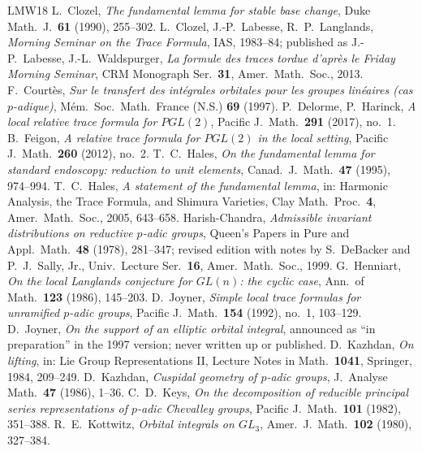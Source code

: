 \documentclass[12pt,letterpaper]{article}
\numberwithin{equation}{section}
\theoremstyle{plain}
\theoremstyle{remark}
\theoremstyle{plain}
\theoremstyle{definition}
\theoremstyle{remark}
\theoremstyle{remark}
\begin{document}
\begin{thebibliography}{LMW18}
 L.~Clozel, \emph{The fundamental lemma for stable base change}, Duke Math.\ J.\ \textbf{61} (1990), 255--302.
 L.~Clozel, J.-P.~Labesse, R.~P.~Langlands, \emph{Morning Seminar on the Trace Formula}, IAS, 1983--84; published as J.-P.~Labesse, J.-L.~Waldspurger, \emph{La formule des traces tordue d'apr\`es le Friday Morning Seminar}, CRM Monograph Ser.\ \textbf{31}, Amer.\ Math.\ Soc., 2013.
 F.~Court\`es, \emph{Sur le transfert des int\'egrales orbitales pour les groupes lin\'eaires (cas $p$-adique)}, M\'em.\ Soc.\ Math.\ France (N.S.) \textbf{69} (1997).
 P.~Delorme, P.~Harinck, \emph{A local relative trace formula for $PGL(2)$}, Pacific J.\ Math.\ \textbf{291} (2017), no.~1.
 B.~Feigon, \emph{A relative trace formula for $PGL(2)$ in the local setting}, Pacific J.\ Math.\ \textbf{260} (2012), no.~2.
 T.~C.~Hales, \emph{On the fundamental lemma for standard endoscopy: reduction to unit elements}, Canad.\ J.\ Math.\ \textbf{47} (1995), 974--994.
 T.~C.~Hales, \emph{A statement of the fundamental lemma}, in: Harmonic Analysis, the Trace Formula, and Shimura Varieties, Clay Math.\ Proc.\ \textbf{4}, Amer.\ Math.\ Soc., 2005, 643--658.
 Harish-Chandra, \emph{Admissible invariant distributions on reductive $p$-adic groups}, Queen's Papers in Pure and Appl.\ Math.\ \textbf{48} (1978), 281--347; revised edition with notes by S.~DeBacker and P.~J.~Sally, Jr., Univ.\ Lecture Ser.\ \textbf{16}, Amer.\ Math.\ Soc., 1999.
 G.~Henniart, \emph{On the local Langlands conjecture for $GL(n)$: the cyclic case}, Ann.\ of Math.\ \textbf{123} (1986), 145--203.
 D.~Joyner, \emph{Simple local trace formulas for unramified $p$-adic groups}, Pacific J.\ Math.\ \textbf{154} (1992), no.~1, 103--129.
 D.~Joyner, \emph{On the support of an elliptic orbital integral}, announced as ``in preparation'' in the 1997 version; never written up or published.
 D.~Kazhdan, \emph{On lifting}, in: Lie Group Representations II, Lecture Notes in Math.\ \textbf{1041}, Springer, 1984, 209--249.
 D.~Kazhdan, \emph{Cuspidal geometry of $p$-adic groups}, J.\ Analyse Math.\ \textbf{47} (1986), 1--36.
 C.~D.~Keys, \emph{On the decomposition of reducible principal series representations of $p$-adic Chevalley groups}, Pacific J.\ Math.\ \textbf{101} (1982), 351--388.
 R.~E.~Kottwitz, \emph{Orbital integrals on $GL_3$}, Amer.\ J.\ Math.\ \textbf{102} (1980), 327--384.

\end{thebibliography}
\end{document}

